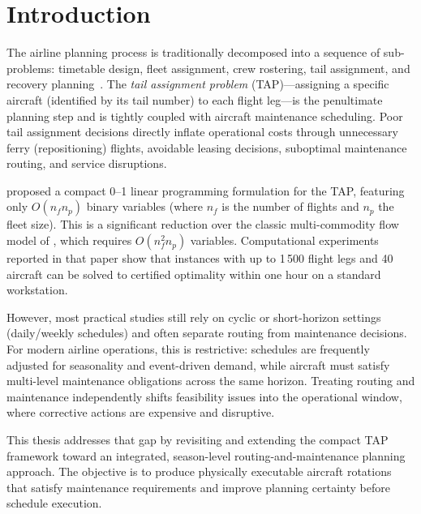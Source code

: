 \section{Introduction}
\label{sec:intro}

The airline planning process is traditionally decomposed into a sequence of
sub-problems: timetable design, fleet assignment, crew rostering, tail
assignment, and recovery planning~\citep{barnhart2003applications,
gopalan1998mathematical}.  The \emph{tail assignment problem} (TAP)—assigning
a specific aircraft (identified by its tail number) to each flight leg—is the
penultimate planning step and is tightly coupled with aircraft maintenance
scheduling.  Poor tail assignment decisions directly inflate operational costs
through unnecessary ferry (repositioning) flights, avoidable leasing decisions,
suboptimal maintenance routing, and service disruptions.

\citet{khaled2018compact} proposed a compact 0--1 linear programming
formulation for the TAP, featuring only $O(n_f n_p)$ binary variables (where
$n_f$ is the number of flights and $n_p$ the fleet size).  This is a
significant reduction over the classic multi-commodity flow model of
\citet{levin1971scheduling}, which requires $O(n_f^2 n_p)$ variables.
Computational experiments reported in that paper show that instances with up
to 1\,500 flight legs and 40 aircraft can be solved to certified optimality
within one hour on a standard workstation.

However, most practical studies still rely on cyclic or short-horizon settings
(daily/weekly schedules) and often separate routing from maintenance decisions.
For modern airline operations, this is restrictive: schedules are frequently
adjusted for seasonality and event-driven demand, while aircraft must satisfy
multi-level maintenance obligations across the same horizon.  Treating routing
and maintenance independently shifts feasibility issues into the operational
window, where corrective actions are expensive and disruptive.

This thesis addresses that gap by revisiting and extending the compact TAP
framework toward an integrated, season-level routing-and-maintenance planning
approach.  The objective is to produce physically executable aircraft rotations
that satisfy maintenance requirements and improve planning certainty before
schedule execution.

